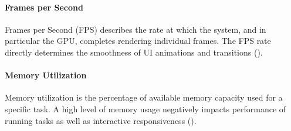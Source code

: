 \paragraph*{Frames per Second}\label{paragraph::fps}\hfill \break
Frames per Second (FPS) describes the rate at which the system, and in particular the GPU,
completes rendering individual frames. The FPS rate directly determines the smoothness of UI
animations and transitions (\cite{Google2020}).

\paragraph*{Memory Utilization}\label{paragraph::memory_utilization}\hfill \break
Memory utilization is the percentage of available memory capacity used for a specific task. 
A high level of memory usage negatively impacts performance of running tasks as well as interactive responsiveness (\cite{Ljubuncic2015}).

